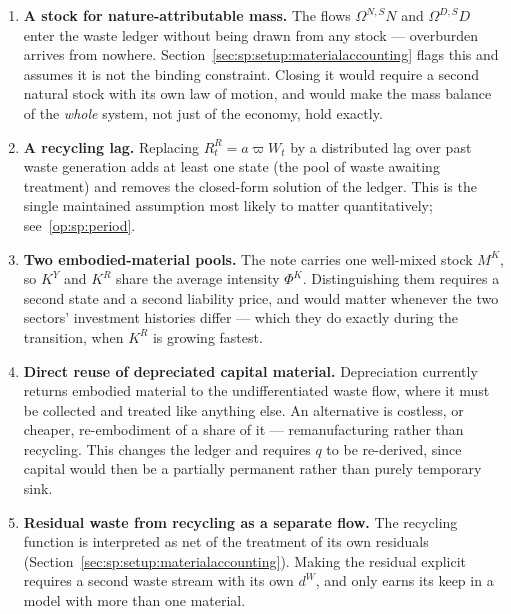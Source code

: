 \begin{enumerate}[label=\textbf{E\arabic*.},ref=E\arabic*,leftmargin=2.6em,itemsep=0.35em]

\item\label{ext:sp:manna} \textbf{A stock for nature-attributable mass.} The flows
$\Omega^{N,S}N$ and $\Omega^{D,S}D$ enter the waste ledger without being drawn from any stock ---
overburden arrives from nowhere. Section~\ref{sec:sp:setup:materialaccounting} flags this and assumes
it is not the binding constraint. Closing it would require a second natural stock with its own law of
motion, and would make the mass balance of the \emph{whole} system, not just of the economy, hold
exactly.

\item\label{ext:sp:lag} \textbf{A recycling lag.} Replacing $R^R_t=a\varpi W_t$ by a distributed lag
over past waste generation adds at least one state (the pool of waste awaiting treatment) and removes
the closed-form solution of the ledger. This is the single maintained assumption most likely to matter
quantitatively; see~\ref{op:sp:period}.

\item\label{ext:sp:pools} \textbf{Two embodied-material pools.} The note carries one well-mixed
stock $M^K$, so $K^Y$ and $K^R$ share the average intensity $\Phi^K$. Distinguishing them requires a
second state and a second liability price, and would matter whenever the two sectors' investment
histories differ --- which they do exactly during the transition, when $K^R$ is growing fastest.

\item\label{ext:sp:reuse} \textbf{Direct reuse of depreciated capital material.} Depreciation
currently returns embodied material to the undifferentiated waste flow, where it must be collected and
treated like anything else. An alternative is costless, or cheaper, re-embodiment of a share of it ---
remanufacturing rather than recycling. This changes the ledger and requires $q$ to be re-derived, since
capital would then be a partially permanent rather than purely temporary sink.

\item\label{ext:sp:residual} \textbf{Residual waste from recycling as a separate flow.} The recycling
function is interpreted as net of the treatment of its own residuals
(Section~\ref{sec:sp:setup:materialaccounting}). Making the residual explicit requires a second waste
stream with its own $d^W$, and only earns its keep in a model with more than one material.


\end{enumerate}
